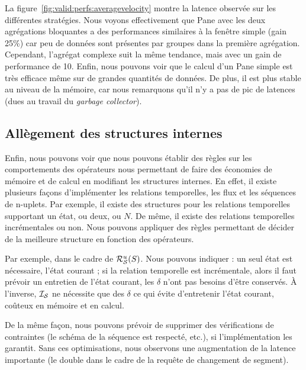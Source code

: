 La figure~\ref{fig:valid:perfs:averagevelocity} montre la latence observée sur les différentes stratégies. Nous voyons effectivement que Pane avec les deux agrégations bloquantes a des performances similaires à la fenêtre simple (gain 25\%) car peu de données sont présentes par groupes dans la première agrégation. Cependant, l'agrégat complexe suit la même tendance, mais avec un gain de performance de 10. Enfin, nous pouvons voir que le calcul d'un Pane simple est très efficace même sur de grandes quantités de données. De plus, il est plus stable au niveau de la mémoire, car nous remarquons qu'il n'y a pas de pic de latences (dues au travail du \textit{garbage collector}).

\subsection{Allègement des structures internes}
Enfin, nous pouvons voir que nous pouvons établir des règles sur les comportements des opérateurs nous permettant de faire des économies de mémoire et de calcul en modifiant les structures internes. En effet, il existe plusieurs façons d'implémenter les relations temporelles, les flux et les séquences de n-uplets. Par exemple, il existe des structures pour les relations temporelles supportant un état, ou deux, ou $N$. De même, il existe des relations temporelles incrémentales ou non. Nous pouvons appliquer des règles permettant de décider de la meilleure structure en fonction des opérateurs.

Par exemple, dans le cadre de $\mathcal{R}_{\mathcal S}^{u}(S)$. Nous pouvons indiquer : un seul état est nécessaire, l'état courant ; si la relation temporelle est incrémentale, alors il faut prévoir un entretien de l'état courant, les $\delta$ n'ont pas besoins d'être conservés. À l'inverse, $\mathcal{I_S}$ ne nécessite que des $\delta$ ce qui évite d'entretenir l'état courant, coûteux en mémoire et en calcul.

De la même façon, nous pouvons prévoir de supprimer des vérifications de contraintes (le schéma de la séquence est respecté, etc.), si l'implémentation les garantit. Sans ces optimisations, nous observons une augmentation de la latence importante (le double dans le cadre de la requête de changement de segment).